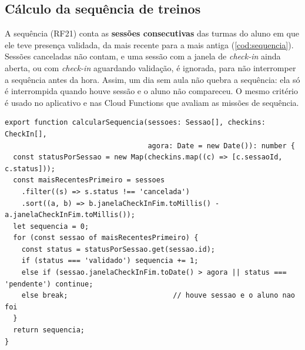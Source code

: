\subsection{Cálculo da sequência de treinos}

A sequência (RF21) conta as \textbf{sessões consecutivas} das turmas do
aluno em que ele teve presença validada, da mais recente para a mais
antiga (\autoref{cod:sequencia}). Sessões canceladas não contam, e uma
sessão com a janela de \textit{check-in} ainda aberta, ou com
\textit{check-in} aguardando validação, é ignorada, para não interromper a
sequência antes da hora. Assim, um dia sem aula não quebra a sequência:
ela só é interrompida quando houve sessão e o aluno não compareceu. O
mesmo critério é usado no aplicativo e nas Cloud Functions que avaliam as
missões de sequência.

\begin{codigo}[H]
  \caption{Cálculo da sequência de treinos por sessão (TypeScript)}
  \label{cod:sequencia}
\begin{lstlisting}
export function calcularSequencia(sessoes: Sessao[], checkins: CheckIn[],
                                  agora: Date = new Date()): number {
  const statusPorSessao = new Map(checkins.map((c) => [c.sessaoId, c.status]));
  const maisRecentesPrimeiro = sessoes
    .filter((s) => s.status !== 'cancelada')
    .sort((a, b) => b.janelaCheckInFim.toMillis() - a.janelaCheckInFim.toMillis());
  let sequencia = 0;
  for (const sessao of maisRecentesPrimeiro) {
    const status = statusPorSessao.get(sessao.id);
    if (status === 'validado') sequencia += 1;
    else if (sessao.janelaCheckInFim.toDate() > agora || status === 'pendente') continue;
    else break;                         // houve sessao e o aluno nao foi
  }
  return sequencia;
}
\end{lstlisting}
\end{codigo}

